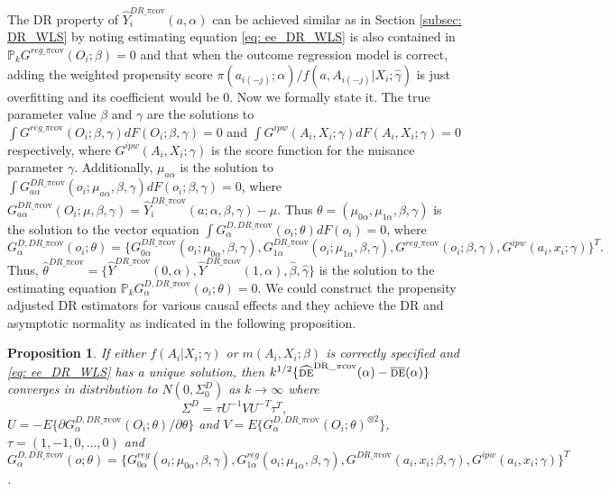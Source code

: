 \documentclass[oupdraft]{biostatistics}
\newtheorem{proposition}{Proposition}
\begin{document}
The DR property of $\widehat{Y}_i^{DR\_\pi\text{cov}}(a,\alpha)$ can be achieved similar as in Section \ref{subsec: DR_WLS} by noting estimating equation \eqref{eq: ee_DR_WLS} is also contained in $\mathds{P}_kG^{reg\_\pi\text{cov}}(O_i;\beta)=0$ and that when the outcome regression model is correct, adding the weighted propensity score $\pi(a_{i(-j)};\alpha)/f(a, A_{i(-j)}|X_i;\hat\gamma)$ is just overfitting and its coefficient would be 0. Now we formally state it. The true parameter value $\beta$ and $\gamma$ are the solutions to $\int G^{reg\_\pi\text{cov}}(O_i;\beta,\gamma)dF(O_i;\beta,\gamma)=0$ and $\int G^{ipw}(A_i,X_i;\gamma)dF(A_i,X_i;\gamma)=0$ respectively, where  $G^{ipw}(A_i,X_i;\gamma)$ is the score function for the nuisance parameter $\gamma$. Additionally, $\mu_{a\alpha}$ is the solution to $\int G^{DR\_\pi\text{cov}}_{a\alpha}(o_i;\mu_{a\alpha},\beta,\gamma) dF(o_i;\beta,\gamma) = 0$, where $G^{DR\_\pi\text{cov}}_{a\alpha}(O_i;\mu,\beta,\gamma) =\widehat{Y}_i^{DR\_\pi\text{cov}}(a;\alpha,\beta,\gamma)- \mu$.  Thus $\theta=(\mu_{0\alpha},\mu_{1\alpha},\beta,\gamma)$ is the solution to the vector equation $\int G^{ D, DR\_\pi\text{cov}}_{\alpha}(o_i;\theta) dF(o_i) = 0$, where $$G^{ D,DR\_\pi\text{cov}}_{\alpha}(o_i;\theta) = \{G^{DR\_\pi\text{cov}}_{0\alpha}(o_i;\mu_{0\alpha},\beta,\gamma),G^{DR\_\pi\text{cov}}_{1\alpha}(o_i;\mu_{1\alpha},\beta,\gamma),G^{reg\_\pi\text{cov}}(o_i;\beta,\gamma),G^{ipw}(a_i,x_i;\gamma)\}^T.$$ Thus, $\hat \theta^{DR\_\pi\text{cov}}=\{\hat Y^{DR\_\pi\text{cov}}(0,\alpha),\hat Y^{DR\_\pi\text{cov}}(1,\alpha),\hat\beta,\hat\gamma\}$ is the solution to the estimating equation $\mathds{P}_k G^{D,DR\_\pi\text{cov}}_{\alpha}(o_i;\theta)=0$. We could construct the propensity adjusted DR estimators for various causal effects and they achieve the DR and asymptotic normality as indicated in the following proposition. 

\begin{proposition}\label{prop: DR_pi_cov}
If either $f(A_i|X_i;\gamma)$ or $m(A_i,X_i;\beta)$ is correctly specified and \eqref{eq: ee_DR_WLS} has a unique solution, then \emph{$k^{1/2}\{\widehat{\textsc{de}}^{\text{DR\_}\pi\text{cov}}(\alpha)-\overline{\textsc{de}}(\alpha)\}$} converges in distribution to $N(0,\Sigma_0^{D})$ as $k \to \infty$ where 
\[
\Sigma^{D} = \tau U^{-1} V U^{-T}\tau^T,
\]
$U=-E\{\partial G_{\alpha}^{D,DR\_\pi\text{cov}}(O_i;\theta)/\partial \theta\}$ and $V=E\{G_{\alpha}^{D,DR\_\pi\text{cov}}(O_i;\theta)^{\otimes 2}\}$, $\tau=(1,-1, 0,\ldots,0)$ and \\$G^{D,DR\_\pi\text{cov}}_{\alpha}(o;\theta)=\{G^{reg}_{0\alpha}(o_i;\mu_{0\alpha},\beta,\gamma),G^{reg}_{1\alpha}(o_i;\mu_{1\alpha},\beta,\gamma),G^{DR\_\pi\text{cov}}(a_i,x_i;\beta,\gamma),G^{ipw}(a_i,x_i;\gamma)\}^T$.
\end{proposition}
\end{document}
